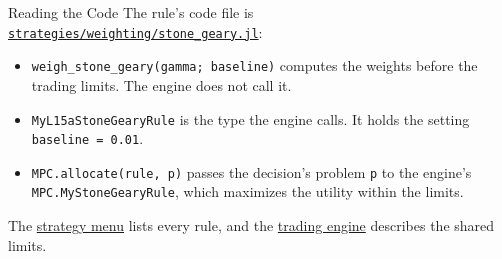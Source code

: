 \documentclass[aspectratio=169,11pt]{beamer}
\newcommand{\repo}{https://github.com/varnerlab/CHEME-5660-CourseRepository-Fall-2026/blob/main/lectures/week-15/L15a}
\begin{document}
\begin{frame}{Reading the Code}
  \vspace{0.3em}
  The rule's code file is
  \href{\repo/strategies/weighting/stone_geary.jl}{\texttt{strategies/weighting/stone\_geary.jl}}:
  \begin{itemize}\setlength{\itemsep}{0.5em}
    \item \texttt{weigh\_stone\_geary(gamma; baseline)} computes the weights before the trading limits. The engine does not call it.
    \item \texttt{MyL15aStoneGearyRule} is the type the engine calls. It holds the setting \texttt{baseline~=~0.01}.
    \item \texttt{MPC.allocate(rule, p)} passes the decision's problem \texttt{p} to the engine's \texttt{MPC.MyStoneGearyRule}, which maximizes the utility within the limits.
  \end{itemize}

  \vspace{0.5em}
  The \href{\repo/strategies/CHEME-5660-L15a-Strategy-Menu-Fall-2026.ipynb}{strategy menu} lists every rule, and the \href{\repo/engine/CHEME-5660-L15a-Trading-Engine-Fall-2026.ipynb}{trading engine} describes the shared limits.
\end{frame}
\end{document}
